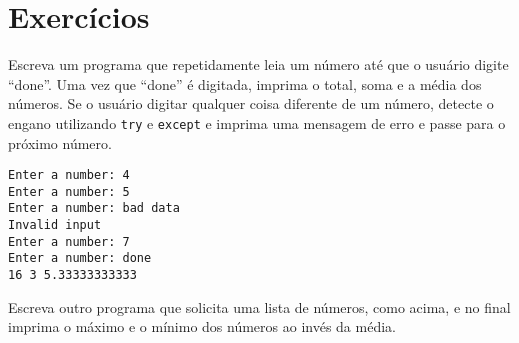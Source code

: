 \section{Exercícios}

\begin{ex}

Escreva um programa que repetidamente leia um número até que o usuário digite
``done''. Uma vez que ``done'' é digitada, imprima o total, soma e a média dos
números. Se o usuário digitar qualquer coisa diferente de um número, detecte
o engano utilizando {\tt try} e {\tt except} e imprima uma mensagem de erro e
passe para o próximo número.

\begin{verbatim}
Enter a number: 4
Enter a number: 5
Enter a number: bad data
Invalid input
Enter a number: 7
Enter a number: done
16 3 5.33333333333
\end{verbatim}
\end{ex}

\begin{ex}

Escreva outro programa que solicita uma lista de números, como acima, e no
final imprima o máximo e o mínimo dos números ao invés da média.
\end{ex}


